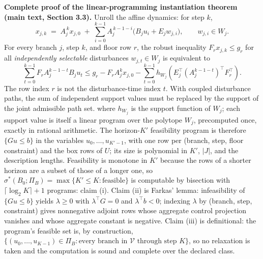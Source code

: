 \documentclass[11pt]{article}
\theoremstyle{definition}
\begin{document}
\bigskip
\noindent\textbf{Complete proof of the linear-programming instantiation theorem (main text,
Section 3.3).} Unroll the affine dynamics: for step \(k\),
\[
x_{j,k} \;=\; A_{j}^{\,k} x_{j,0} \;+\; \sum_{i=0}^{k-1} A_{j}^{\,k-1-i}\bigl(B_{j} u_{i} + E_{j} w_{j,i}\bigr),
\qquad w_{j,i} \in W_{j}.
\]
For every branch \(j\), step \(k\), and floor row \(r\), the robust inequality \(F_r x_{j,k}\le g_r\) for all \emph{independently selectable} disturbances \(w_{j,t}\in W_j\) is equivalent to
\[\sum_{t=0}^{k-1}F_r A_j^{k-1-t}B_j u_t
\le g_r-F_r A_j^k x_{j,0}-\sum_{t=0}^{k-1}h_{W_j}\!\left(E_j^{\top}(A_j^{k-1-t})^{\top}F_r^{\top}\right).\]
The row index \(r\) is not the disturbance-time index \(t\). With coupled disturbance paths, the sum of independent support values must be replaced by the support of the joint admissible path set.
where \(h_{W_{j}}\) is the support function of \(W_{j}\); each support value is itself a
linear program over the polytope \(W_{j}\), precomputed once, exactly in rational
arithmetic. The horizon-\(K'\) feasibility program is therefore
\(\{G u \le b\}\) in the variables \(u_{0},\dots,u_{K'-1}\), with one row per (branch, step,
floor constraint) and the box rows of \(U\); its size is polynomial in \(K'\), \(|J|\), and
the description lengths. Feasibility is monotone in \(K'\) because the rows of a shorter
horizon are a subset of those of a longer one, so \(\sigma^{*}(B_{0};\Pi_{B}) = \max\{K'
\le K : \text{feasible}\}\) is computable by bisection with \(\lceil \log_{2} K \rceil + 1\)
programs: claim (i). Claim (ii) is Farkas' lemma: infeasibility of \(\{Gu \le b\}\) yields
\(\lambda \ge 0\) with \(\lambda^{\top} G = 0\) and \(\lambda^{\top} b < 0\); indexing
\(\lambda\) by (branch, step, constraint) gives nonnegative adjoint rows whose aggregate
control projection vanishes and whose aggregate constant is negative. Claim (iii) is
definitional: the program's feasible set is, by construction,
\(\{(u_{0},\dots,u_{K-1}) \in \Pi_{B} : \text{every branch in } \mathcal{V} \text{ through
step } K\}\), so no relaxation is taken and the computation is sound and complete over the
declared class.
\end{document}
